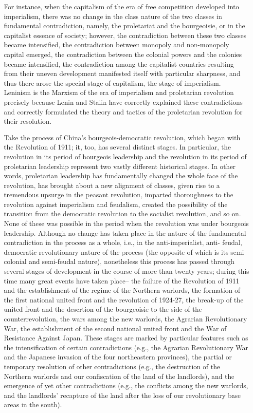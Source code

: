 \documentclass{article}
\begin{document}
For instance, when the capitalism of the era of free competition developed into
imperialism, there was no change in the class nature of the two classes in
fundamental contradiction, namely, the proletariat and the bourgeoisie, or in
the capitalist essence of society; however, the contradiction between these two
classes became intensified, the contradiction between monopoly and non-monopoly
capital emerged, the contradiction between the colonial powers and the colonies
became intensified, the contradiction among the capitalist countries resulting
from their uneven development manifested itself with particular sharpness, and
thus there arose the special stage of capitalism, the stage of imperialism.
Leninism is the Marxism of the era of imperialism and proletarian revolution
precisely because Lenin and Stalin have correctly explained these
contradictions and correctly formulated the theory and tactics of the
proletarian revolution for their resolution.

Take the process of China's bourgeois-democratic revolution, which began with
the Revolution of 1911; it, too, has several distinct stages. In particular,
the revolution in its period of bourgeois leadership and the revolution in its
period of proletarian leadership represent two vastly different historical
stages. In other words, proletarian leadership has fundamentally changed the
whole face of the revolution, has brought about a new alignment of classes,
given rise to a tremendous upsurge in the peasant revolution, imparted
thoroughness to the revolution against imperialism and feudalism, created the
possibility of the transition from the democratic revolution to the socialist
revolution, and so on. None of these was possible in the period when the
revolution was under bourgeois leadership. Although no change has taken place
in the nature of the fundamental contradiction in the process as a whole, i.e.,
in the anti-imperialist, anti- feudal, democratic-revolutionary nature of the
process (the opposite of which is its semi-colonial and semi-feudal nature),
nonetheless this process has passed through several stages of development in
the course of more than twenty years; during this time many great events have
taken place-- the failure of the Revolution of 1911 and the establishment of
the regime of the Northern warlords, the formation of the first national united
front and the revolution of 1924-27, the break-up of the united front and the
desertion of the bourgeoisie to the side of the counterrevolution, the wars
among the new warlords, the Agrarian Revolutionary War, the establishment of
the second national united front and the War of Resistance Against Japan. These
stages are marked by particular features such as the intensification of certain
contradictions (e.g., the Agrarian Revolutionary War and the Japanese invasion
of the four northeastern provinces), the partial or temporary resolution of
other contradictions (e.g., the destruction of the Northern warlords and our
confiscation of the land of the landlords), and the emergence of yet other
contradictions (e.g., the conflicts among the new warlords, and the landlords'
recapture of the land after the loss of our revolutionary base areas in the
south).
\end{document}
